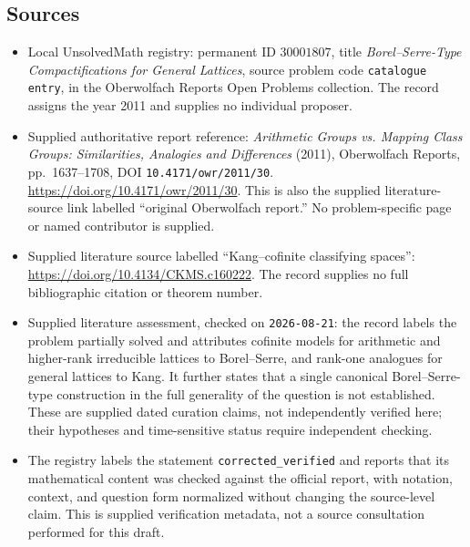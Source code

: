 \documentclass[11pt]{article}
\begin{document}
\subsection{Sources}
\begin{itemize}
\item Local UnsolvedMath registry: permanent ID \(30001807\), title \emph{Borel--Serre-Type Compactifications for General Lattices}, source problem code \texttt{catalogue entry}, in the Oberwolfach Reports Open Problems collection. The record assigns the year 2011 and supplies no individual proposer.
\item Supplied authoritative report reference: \emph{Arithmetic Groups vs. Mapping Class Groups: Similarities, Analogies and Differences} (2011), Oberwolfach Reports, pp.~1637--1708, DOI \texttt{10.4171/owr/2011/30}. \url{https://doi.org/10.4171/owr/2011/30}. This is also the supplied literature-source link labelled ``original Oberwolfach report.'' No problem-specific page or named contributor is supplied.
\item Supplied literature source labelled ``Kang--cofinite classifying spaces'': \url{https://doi.org/10.4134/CKMS.c160222}. The record supplies no full bibliographic citation or theorem number.
\item Supplied literature assessment, checked on \texttt{2026-08-21}: the record labels the problem partially solved and attributes cofinite models for arithmetic and higher-rank irreducible lattices to Borel--Serre, and rank-one analogues for general lattices to Kang. It further states that a single canonical Borel--Serre-type construction in the full generality of the question is not established. These are supplied dated curation claims, not independently verified here; their hypotheses and time-sensitive status require independent checking.
\item The registry labels the statement \texttt{corrected\_verified} and reports that its mathematical content was checked against the official report, with notation, context, and question form normalized without changing the source-level claim. This is supplied verification metadata, not a source consultation performed for this draft.
\end{itemize}
\end{document}
